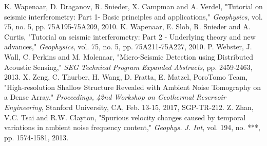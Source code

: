 \documentclass[11pt]{article}
\begin{document}
\begin{thebibliography}{30}
\vspace{-0.2cm}
 K. Wapenaar, D. Draganov, R. Snieder, X. Campman and A. Verdel, "Tutorial on seismic interferometry: Part 1- Basic principles and applications," \textit{Geophysics}, vol. 75, no. 5, pp. 75A195-75A209, 2010.
\vspace{-0.6cm}
 K. Wapenaar, E. Slob, R. Snieder and A. Curtis, "Tutorial on seismic interferometry: Part 2 - Underlying theory and new advances," \textit{Geophysics}, vol. 75, no. 5, pp. 75A211-75A227, 2010.
\vspace{-0.2cm}
 P. Webster, J. Wall, C. Perkins and M. Molenaar, "Micro-Seismic Detection using Distributed Acoustic Sensing," \textit{SEG Technical Program Expanded Abstracts}, pp. 2459-2463, 2013.
\vspace{-0.2cm}
 X. Zeng, C. Thurber, H. Wang, D. Fratta, E. Matzel, PoroTomo Team, "High-resolution Shallow Structure Revealed with Ambient Noise Tomography on a Dense Array," \textit{Proceedings, 42nd Workshop on Geothermal Reservoir Engineering}, Stanford University, CA, Feb. 13-15, 2017, SGP-TR-212.
\vspace{-0.2cm}
 Z. Zhan, V.C. Tsai and R.W. Clayton, "Spurious velocity changes caused by temporal variations in ambient noise frequency content," \textit{Geophys. J. Int}, vol. 194, no. ***, pp. 1574-1581, 2013.

\end{thebibliography}
\endgroup
\end{document}
